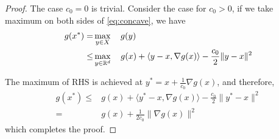 \begin{proof}
\label{prf:lem:concave}
The case  $c_0 = 0$ is trivial. 
Consider the case for $c_0 > 0$, if we take maximum on both sides of \cref{eq:concave}, we have
\begin{align*}
    g(x^*) =& \max_{y\in X}\quad g(y)
    \\
    \le& \max_{y\in \mathbb{R}^d}\quad g(x) + \langle y-x, \nabla g(x)\rangle - \frac{c_0}{2}\| y - x\|^2
\end{align*}

The maximum of RHS is achieved at $y^* = x + \frac{1}{c_0}\nabla g(x)$, and therefore,
\begin{align*}
    g(x^*) \le& g(x) + \langle y^* - x, \nabla g(x)\rangle - \frac{c_0}{2}\| y^* - x \|^2
    \\
    =& g(x) + \frac{1}{2c_0} \| \nabla g(x) \|^2
\end{align*}
which completes the proof.
\end{proof}
